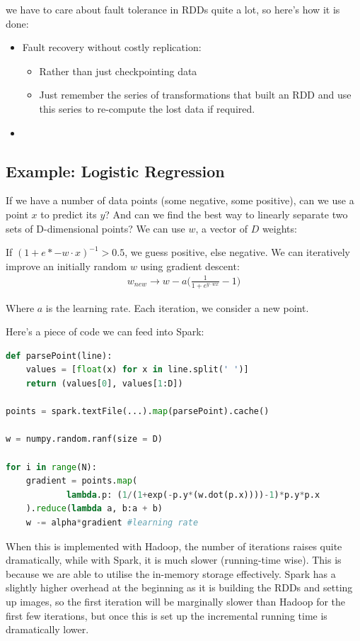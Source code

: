 \documentclass[11pt,a4paper,titlepage,dvipsnames,cmyk]{scrartcl}
\begin{document}
we have to care about fault tolerance in RDDs quite a lot, so here's how it is done:
\begin{itemize}
    \item Fault recovery without costly replication:
    \begin{itemize}
        \item Rather than just checkpointing data
        \item Just remember the series of transformations that built an RDD and use this series to re-compute the lost data if required.
    \end{itemize}
    \item  
\end{itemize}

\subsection{Example: Logistic Regression}
If we have a number of data points (some negative, some positive), can we use a point $x$ to predict its $y$? And can we find the best way to linearly separate two sets of D-dimensional points? We can use $w$, a vector of $D$ weights:

If $(1+e*{-w\cdot x})^{-1}>0.5$, we guess positive, else negative. We can iteratively improve an initially random $w$ using gradient descent:
\begin{align*}
w_{new} \rightarrow w - a\bigg( \frac{1}{1+e^{y\cdot wx}} -1\bigg)
\end{align*}

Where $a$ is the learning rate. Each iteration, we consider a new point.

Here's a piece of code we can feed into Spark:
\begin{lstlisting}[language=Python]
def parsePoint(line):
    values = [float(x) for x in line.split(' ')]
    return (values[0], values[1:D])

points = spark.textFile(...).map(parsePoint).cache()

w = numpy.random.ranf(size = D)

for i in range(N):
    gradient = points.map(
            lambda.p: (1/(1+exp(-p.y*(w.dot(p.x))))-1)*p.y*p.x
    ).reduce(lambda a, b:a + b)
    w -= alpha*gradient #learning rate
\end{lstlisting}

When this is implemented with Hadoop, the number of iterations raises quite dramatically, while with Spark, it is much slower (running-time wise). This is because we are able to utilise the in-memory storage effectively. Spark has a slightly higher overhead at the beginning as it is building the RDDs and setting up images, so the first iteration will be marginally slower than Hadoop for the first few iterations, but once this is set up the incremental running time is dramatically lower.
\end{document}
